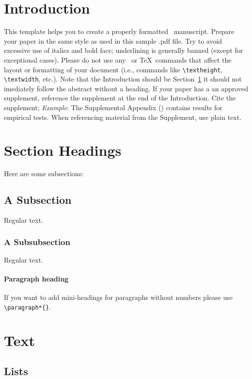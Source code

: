 \documentclass[ecta,nameyear,draft]{econsocart}
\theoremstyle{plain}
\theoremstyle{definition}
\begin{document}
\section{Introduction}\label{s1}

This template helps you to create a properly formatted \LaTeXe\ manuscript.
Prepare your paper in the same style as used in this sample .pdf file.
Try to avoid excessive use of italics and bold face; underlining is generally banned (except for exceptional cases). Please do not use any \LaTeXe\ or \TeX\ commands that affect the layout or formatting of your document (i.e., commands like \verb|\textheight|, \verb|\textwidth|, etc.). Note that the Introduction should be Section~\ref{s1} it should not imediately follow the abstract without a heading. If your paper has a an approved supplement, reference the supplement at the end of the Introduction.  Cite the supplement;  \textit{Example}: The Supplemental Appendix (\citet{b2}) contains results for empirical tests. 
When referencing material from the Supplement, use plain text.


\section{Section Headings}
Here are some subsections:
\subsection{A Subsection}
Regular text.
\subsubsection{A Subsubsection}
Regular text.

\paragraph*{Paragraph heading} If you want to add mini-headings for paragraphs without numbers please use \verb|\paragraph*{}|.

\section{Text}

\subsection{Lists}
\end{document}
